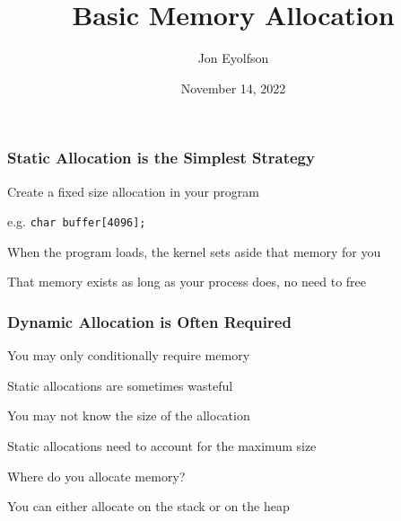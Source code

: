 

\title{Basic Memory Allocation}
\author{Jon Eyolfson}
\date{November 14, 2022}


  \begin{frame}
    \titlepage
  \end{frame}

  \begin{frame}
    \frametitle{Static Allocation is the Simplest Strategy}

    Create a fixed size allocation in your program

    \hspace{2em} e.g. \lstinline|char buffer[4096];|

    \vspace{2em}

    When the program loads, the kernel sets aside that memory
    for you

    \vspace{2em}

    That memory exists as long as your process does, no need to free
  \end{frame}

  \begin{frame}
    \frametitle{Dynamic Allocation is Often Required}

    You may only conditionally require memory

    \hspace{2em} Static allocations are sometimes wasteful

    \vspace{2em}

    You may not know the size of the allocation

    \hspace{2em} Static allocations need to account for the maximum size

    \vspace{2em}

    Where do you allocate memory?

    \hspace{2em} You can either allocate on the stack or on the heap
  \end{frame}

